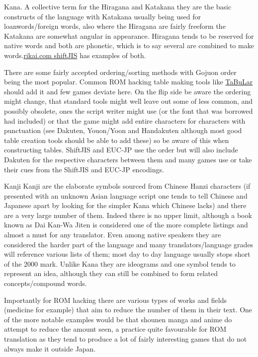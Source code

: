 \documentclass[
]{book}
\begin{document}
Kana. A collective term for the Hiragana and Katakana they are the basic constructs of the language with Katakana usually being used for loanwords/foreign words, also where the Hiragana are fairly freeform the Katakana are somewhat angular in appearance. Hiragana tends to be reserved for native words and both are phonetic, which is to say several are combined to make words.\href{http://www.rikai.com/library/kanjitables/kanji_codes.sjis.shtml}{rikai.com shiftJIS} has examples of both.

There are some fairly accepted ordering/sorting methods with Gojuon order being the most popular. Common ROM hacking table making tools like \href{http://www.romhacking.net/utilities/55/}{TaBuLar} should add it and few games deviate here. On the flip side be aware the ordering might change, that standard tools might well leave out some of less common, and possibly obsolete, ones the script writer might use (or the font that was borrowed had included) or that the game might add entire characters for characters with punctuation (see Dakuten, Youon/Yoon and Handakuten although most good table creation tools should be able to add these) so be aware of this when constructing tables. ShiftJIS and EUC-JP use the order but will also include Dakuten for the respective characters between them and many games use or take their cues from the ShiftJIS and EUC-JP encodings.

Kanji Kanji are the elaborate symbols sourced from Chinese Hanzi characters (if presented with an unknown Asian language script one tends to tell Chinese and Japanese apart by looking for the simpler Kana which Chinese lacks) and there are a very large number of them. Indeed there is no upper limit, although a book known as Dai Kan-Wa Jiten is considered one of the more complete listings and almost a must for any translator. Even among native speakers they are considered the harder part of the language and many translators/language grades will reference various lists of them; most day to day language usually stops short of the 2000 mark. Unlike Kana they are ideograms and one symbol tends to represent an idea, although they can still be combined to form related concepts/compound words.

Importantly for ROM hacking there are various types of works and fields (medicine for example) that aim to reduce the number of them in their text. One of the more notable examples would be that shounen manga and anime do attempt to reduce the amount seen, a practice quite favourable for ROM translation as they tend to produce a lot of fairly interesting games that do not always make it outside Japan.
\end{document}
